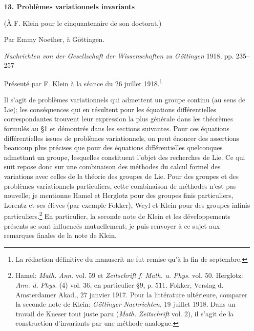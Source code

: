\begin{center}
{\Large\bfseries 13. Problèmes variationnels invariants}\par
\vspace{0.6em}
(À F. Klein pour le cinquantenaire de son doctorat.)\par
\vspace{0.6em}
Par Emmy Noether, à Göttingen.\par
\vspace{1.5em}
\emph{Nachrichten von der Gesellschaft der Wissenschaften zu Göttingen} 1918, pp. 235--257
\end{center}

\vspace{3em}
\begin{center}
Présenté par F. Klein à la séance du 26 juillet 1918.\footnote{La rédaction définitive du manuscrit ne fut remise qu'à la fin de septembre.}
\end{center}

Il s'agit de problèmes variationnels qui admettent un groupe continu (au sens de Lie); les conséquences qui en résultent pour les équations différentielles correspondantes trouvent leur expression la plus générale dans les théorèmes formulés au \S{}1 et démontrés dans les sections suivantes. Pour ces équations différentielles issues de problèmes variationnels, on peut énoncer des assertions beaucoup plus précises que pour des équations différentielles quelconques admettant un groupe, lesquelles constituent l'objet des recherches de Lie. Ce qui suit repose donc sur une combinaison des méthodes du calcul formel des variations avec celles de la théorie des groupes de Lie. Pour des groupes et des problèmes variationnels particuliers, cette combinaison de méthodes n'est pas nouvelle; je mentionne Hamel et Herglotz pour des groupes finis particuliers, Lorentz et ses élèves (par exemple Fokker), Weyl et Klein pour des groupes infinis particuliers.\footnote{Hamel: \emph{Math. Ann.} vol. 59 et \emph{Zeitschrift f. Math. u. Phys.} vol. 50. Herglotz: \emph{Ann. d. Phys.} (4) vol. 36, en particulier \S{}9, p. 511. Fokker, Verslag d. Amsterdamer Akad., 27 janvier 1917. Pour la littérature ultérieure, comparer la seconde note de Klein: \emph{Göttinger Nachrichten}, 19 juillet 1918. Dans un travail de Kneser tout juste paru (\emph{Math. Zeitschrift} vol. 2), il s'agit de la construction d'invariants par une méthode analogue.} En particulier, la seconde note de Klein et les développements présents se sont influencés mutuellement; je puis renvoyer à ce sujet aux remarques finales de la note de Klein.


